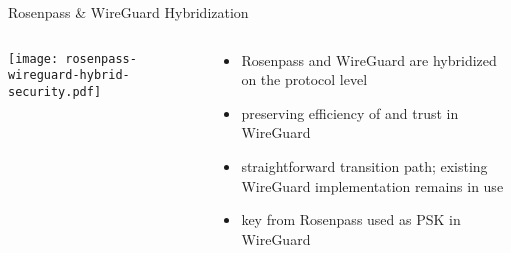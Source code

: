 \begin{frame}{Rosenpass \& WireGuard Hybridization}
  \begin{columns}[c]
    \begin{column}{.5\linewidth}
      \texttt{[image: rosenpass-wireguard-hybrid-security.pdf]}
    \end{column}
    \begin{column}{.45\linewidth}
      \small
      \begin{itemize}
        \item Rosenpass and WireGuard are hybridized on the protocol level
        \item preserving efficiency of and trust in WireGuard
        \item straightforward transition path; existing WireGuard implementation remains in use
        \item key from Rosenpass used as PSK in WireGuard
      \end{itemize}
    \end{column}

  \end{columns}
\end{frame}
